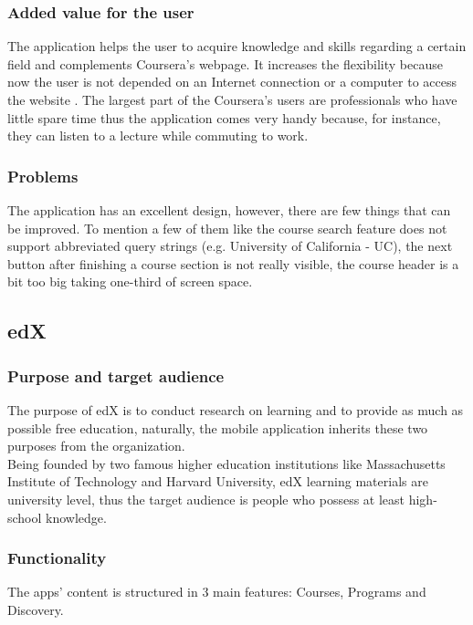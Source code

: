 \documentclass[version=last,fontsize=13pt]{scrartcl}
\begin{document}
		\subsubsection{Added value for the user}

		The application helps the user to acquire knowledge and skills regarding a certain field and complements Coursera's webpage. It increases the flexibility because now the user is not depended on an Internet connection or a computer to access the website . The largest part of the Coursera's users are professionals who have little spare time thus the application comes very handy because, for instance, they can listen to a lecture while commuting to work.  
		
		\subsubsection{Problems}
		The application has an excellent design, however, there are few things that can be improved. To mention a few of them like the course search feature does not support abbreviated query strings (e.g. University of California - UC), the next button after finishing a course section is not really visible, the course header is a bit too big taking one-third of screen space.
		
	\pagebreak
	\subsection{edX}

		\subsubsection{Purpose and target audience}		   
			The purpose of edX is to conduct research on learning and to provide as much as possible free education, naturally, the mobile application inherits these two purposes from the organization.\\

			\indent
			Being founded by two famous higher education institutions like Massachusetts Institute of Technology and Harvard University, edX learning materials are university level, thus the target audience is people who possess at least high-school knowledge.

		\subsubsection{Functionality}
			The apps' content is structured in 3 main features: Courses, Programs and Discovery.
\end{document}
